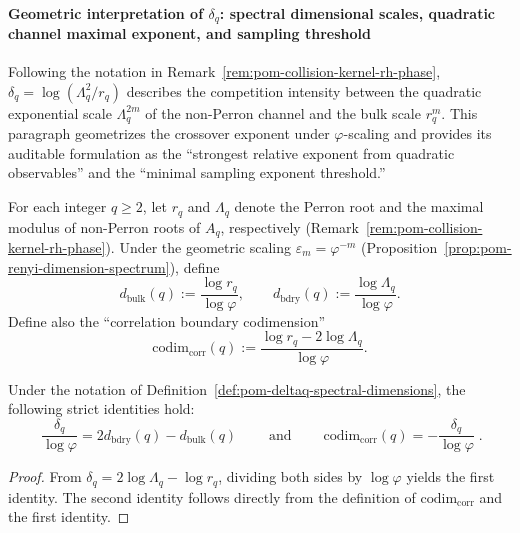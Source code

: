 
\paragraph{Geometric interpretation of \texorpdfstring{$\delta_q$}{deltaq}: spectral dimensional scales, quadratic channel maximal exponent, and sampling threshold}
Following the notation in Remark~\ref{rem:pom-collision-kernel-rh-phase}, \(\delta_q=\log(\Lambda_q^2/r_q)\) describes the competition intensity between the quadratic exponential scale \(\Lambda_q^{2m}\) of the non-Perron channel and the bulk scale \(r_q^{m}\).
This paragraph geometrizes the crossover exponent under \(\varphi\)-scaling and provides its auditable formulation as the ``strongest relative exponent from quadratic observables'' and the ``minimal sampling exponent threshold.''

\begin{definition}\label{def:pom-deltaq-spectral-dimensions}
For each integer \(q\ge 2\), let \(r_q\) and \(\Lambda_q\) denote the Perron root and the maximal modulus of non-Perron roots of \(A_q\), respectively (Remark~\ref{rem:pom-collision-kernel-rh-phase}).
Under the geometric scaling \(\varepsilon_m=\varphi^{-m}\) (Proposition~\ref{prop:pom-renyi-dimension-spectrum}), define
\[
d_{\mathrm{bulk}}(q):=\frac{\log r_q}{\log\varphi},\qquad
d_{\mathrm{bdry}}(q):=\frac{\log \Lambda_q}{\log\varphi}.
\]
Define also the ``correlation boundary codimension''
\[
\mathrm{codim}_{\mathrm{corr}}(q):=\frac{\log r_q-2\log\Lambda_q}{\log\varphi}.
\]
\end{definition}

\begin{proposition}\label{prop:pom-deltaq-spectral-dimension-identity}
Under the notation of Definition~\ref{def:pom-deltaq-spectral-dimensions}, the following strict identities hold:
\[
\boxed{\;
\frac{\delta_q}{\log\varphi}
=2d_{\mathrm{bdry}}(q)-d_{\mathrm{bulk}}(q)
\;}
\qquad\text{and}\qquad
\boxed{\;
\mathrm{codim}_{\mathrm{corr}}(q)=-\frac{\delta_q}{\log\varphi}\; }.
\]
\end{proposition}
\begin{proof}
From \(\delta_q=2\log\Lambda_q-\log r_q\), dividing both sides by \(\log\varphi\) yields the first identity.
The second identity follows directly from the definition of \(\mathrm{codim}_{\mathrm{corr}}\) and the first identity.
\end{proof}

